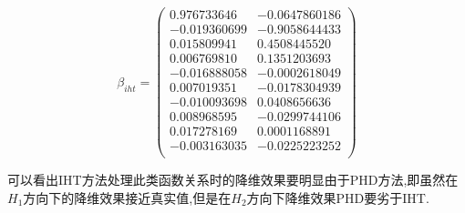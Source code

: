  \begin{equation}       %
    \beta_{iht}= \left(                 %
       \begin{array}{cc}   %
          0.976733646  & -0.0647860186 \\
         -0.019360699  & -0.9058644433 \\
          0.015809941  &  0.4508445520 \\
          0.006769810  &  0.1351203693 \\
         -0.016888058  & -0.0002618049 \\
          0.007019351  & -0.0178304939 \\
         -0.010093698  &  0.0408656636 \\
          0.008968595  & -0.0299744106 \\
          0.017278169  &  0.0001168891 \\
         -0.003163035  & -0.0225223252 \\
       \end{array}
     \right)                 %
 \end{equation}


可以看出IHT方法处理此类函数关系时的降维效果要明显由于PHD方法,即虽然在$H_1$方向下的降维效果接近真实值,但是在$H_2$方向下降维效果PHD要劣于IHT.
